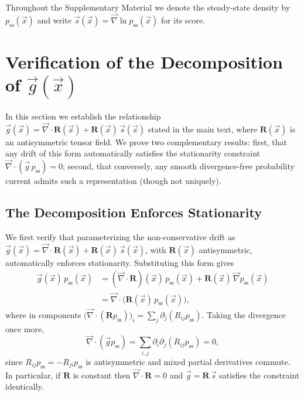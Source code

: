 \documentclass[%
  prl,
  reprint,
  amsmath,
  amssymb,
  aps
]{revtex4-2}
\newcommand{\vvec}[1]{\vec{#1}}
\begin{document}
Throughout the Supplementary Material we denote the steady-state density by $p_{\mathrm{ss}}(\vvec{x})$ and write $\vvec{s}(\vvec{x})=\vvec{\nabla}\ln p_{\mathrm{ss}}(\vvec{x})$ for its score.

\section{Verification of the Decomposition of \texorpdfstring{$\vvec{g}(\vvec{x})$}{g(x)}}
\label{appendix:decomposition_proof}

In this section we establish the relationship $\vvec{g}(\vvec{x})=\vvec{\nabla}\cdot\bm{R}(\vvec{x})+\bm{R}(\vvec{x})\,\vvec{s}(\vvec{x})$ stated in the main text, where $\bm{R}(\vvec{x})$ is an antisymmetric tensor field. We prove two complementary results: first, that any drift of this form automatically satisfies the stationarity constraint $\vvec{\nabla}\cdot(\vvec{g}\,p_{\mathrm{ss}})=0$; second, that conversely, any smooth divergence-free probability current admits such a representation (though not uniquely).

\subsection{The Decomposition Enforces Stationarity}
\label{appendix:stationarity_verification}

We first verify that parameterizing the non-conservative drift as $\vvec{g}(\vvec{x})=\vvec{\nabla}\cdot\bm{R}(\vvec{x})+\bm{R}(\vvec{x})\,\vvec{s}(\vvec{x})$, with $\bm{R}(\vvec{x})$ antisymmetric, automatically enforces stationarity. Substituting this form gives
\begin{equation}
\begin{aligned}
\vvec{g}(\vvec{x})\,p_{\mathrm{ss}}(\vvec{x})
&= (\vvec{\nabla} \cdot \bm{R})(\vvec{x})\,p_{\mathrm{ss}}(\vvec{x}) + \bm{R}(\vvec{x})\,\vvec{\nabla} p_{\mathrm{ss}}(\vvec{x}) \\
&= \vvec{\nabla} \cdot \bigl(\bm{R}(\vvec{x})\,p_{\mathrm{ss}}(\vvec{x})\bigr),
\end{aligned}
\end{equation}
where in components $\bigl(\vvec{\nabla} \cdot (\bm{R}p_{\mathrm{ss}})\bigr)_i = \sum_j \partial_j (R_{ij} p_{\mathrm{ss}})$. Taking the divergence once more,
\begin{equation}
\vvec{\nabla} \cdot (\vvec{g} p_{\mathrm{ss}}) = \sum_{i,j} \partial_i \partial_j (R_{ij} p_{\mathrm{ss}})=0,
\end{equation}
since $R_{ij} p_{\mathrm{ss}} = -R_{ji} p_{\mathrm{ss}}$ is antisymmetric and mixed partial derivatives commute. In particular, if $\bm{R}$ is constant then $\vvec{\nabla}\cdot\bm{R}=0$ and $\vvec{g} = \bm{R}\,\vvec{s}$ satisfies the constraint identically.
\end{document}
